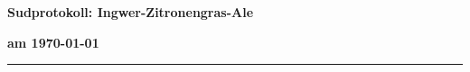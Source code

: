 \documentclass[12pt,oneside,a4paper]{scrartcl}
\begin{document}
	\begin{minipage}{0.70\textwidth}
		{\large \textbf{Sudprotokoll: Ingwer-Zitronengras-Ale}}
	\end{minipage}
	\begin{minipage}[t]{0.29\textwidth}
		{\large \textbf{am \today}}
	\end{minipage}
	\rule{\textwidth}{1pt}
\end{document}
